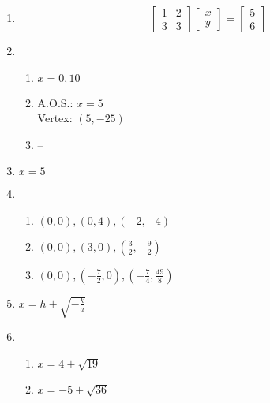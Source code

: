 \documentclass{article}
\begin{document}
\begin{enumerate}
\item 
	\begin{equation*}
	\begin{bmatrix}
	1 & 2 \\
	3 & 3
	\end{bmatrix}
	\begin{bmatrix}
	x \\
	y
	\end{bmatrix} =
	\begin{bmatrix}
	5 \\
	6
	\end{bmatrix}
	\end{equation*}
	
\item

	\begin{enumerate}
	
	\item $x = 0, 10$
	
	\item A.O.S.:  $x = 5$ \\
		Vertex: $(5, -25)$
		
	\item --
	
	\end{enumerate}
	
\item $x = 5$

\item

	\begin{enumerate}
	
	\item $(0, 0), (0, 4), (-2, -4)$
	
	\item $(0,0), (3,0), (\frac{3}{2}, -\frac{9}{2})$
	
	\item $(0,0), (-\frac{7}{2}, 0), (-\frac{7}{4}, \frac{49}{8})$
	
	\end{enumerate}
	
\item $x = h \pm \sqrt{-\frac{k}{a}}$

\item

	\begin{enumerate}
	
	\item $x = 4 \pm \sqrt{19}$
	
	\item $x = -5 \pm \sqrt{36}$
	

\end{enumerate}
\end{enumerate}
\end{document}

